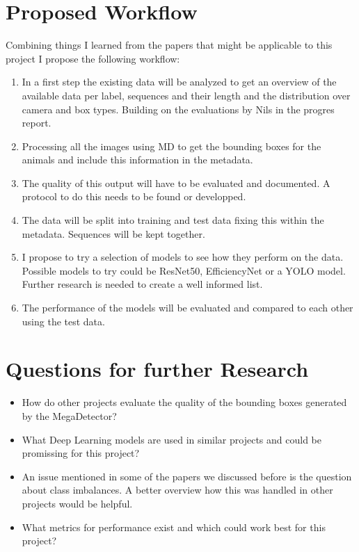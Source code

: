 \documentclass{article}
\begin{document}
\section*{Proposed Workflow}

Combining things I learned from the papers that might be applicable to this project I propose the following workflow:

\begin{enumerate}
  \item In a first step the existing data will be analyzed to get an overview of the available data per label, sequences and their length and the distribution over camera and box types.
  Building on the evaluations by Nils in the progres report.
  
  \item Processing all the images using MD to get the bounding boxes for the animals and include this information in the metadata.
  
  \item The quality of this output will have to be evaluated and documented. A protocol to do this needs to be found or developped.
  
  \item The data will be split into training and test data fixing this within the metadata. Sequences will be kept together.
  
  \item I propose to try a selection of models to see how they perform on the data. Possible models to try could be ResNet50, EfficiencyNet or a YOLO model. 
  Further research is needed to create a well informed list.

  \item The performance of the models will be evaluated and compared to each other using the test data.
  
\end{enumerate}

\section*{Questions for further Research}

\begin{itemize}

  \item How do other projects evaluate the quality of the bounding boxes generated by the MegaDetector?
  \item What Deep Learning models are used in similar projects and could be promissing for this project?
  \item An issue mentioned in some of the papers we discussed before is the question about class imbalances. A better overview how this was handled in other projects would be helpful.
  \item What metrics for performance exist and which could work best for this project?
  
\end{itemize}
\end{document}
